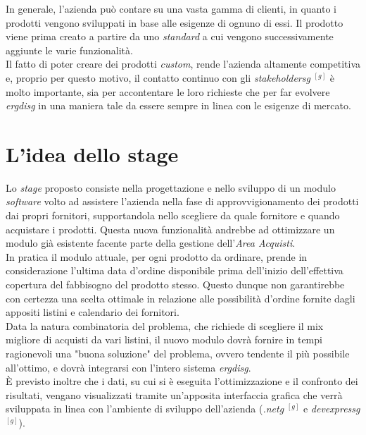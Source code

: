 \noindent In generale, l'azienda può contare su una vasta gamma di clienti,
in quanto i prodotti vengono sviluppati in base alle esigenze di ognuno di essi.
Il prodotto viene prima creato a partire da uno \textit{standard}
a cui vengono successivamente aggiunte le varie funzionalità.\\
Il fatto di poter creare dei prodotti \textit{custom}, rende l'azienda altamente competitiva
e, proprio per questo motivo, il contatto
continuo con gli \textit{\gls{stakeholdersg}} $^{[g]}$ è molto importante, sia per accontentare le loro richieste che per
far evolvere \textit{\gls{ergdisg}} in una maniera tale da essere sempre in linea con le esigenze di mercato.


\section{L'idea dello stage}
\noindent Lo \textit{stage} proposto consiste nella progettazione e nello sviluppo di un modulo \textit{software} volto
ad assistere l'azienda nella fase di approvvigionamento dei prodotti dai propri fornitori, supportandola nello scegliere
da quale fornitore e quando acquistare i prodotti.
\noindent Questa nuova funzionalità andrebbe ad ottimizzare un modulo già esistente facente parte della
gestione dell'\textit{Area Acquisti}.\\
In pratica il modulo attuale, per ogni prodotto da ordinare, prende in considerazione l'ultima data d'ordine disponibile prima dell'inizio
dell'effettiva copertura del fabbisogno del prodotto stesso. Questo dunque non garantirebbe con certezza una scelta ottimale
in relazione alle possibilità d'ordine fornite dagli appositi listini e calendario dei fornitori.\\

\noindent Data la natura combinatoria del problema, che richiede di scegliere il mix migliore di acquisti da vari listini, il nuovo modulo dovrà fornire in tempi ragionevoli una "buona soluzione"
del problema, ovvero tendente il più possibile all'ottimo, e dovrà integrarsi con l'intero sistema \textit{\gls{ergdisg}}.\\

\noindent È previsto inoltre che i dati, su cui si è eseguita l'ottimizzazione e il confronto dei risultati, vengano visualizzati tramite un'apposita
interfaccia grafica che verrà sviluppata in linea con l'ambiente di sviluppo dell'azienda (\textit{\gls{.netg}} $^{[g]}$ e \textit{\gls{devexpressg}} $^{[g]}$).


